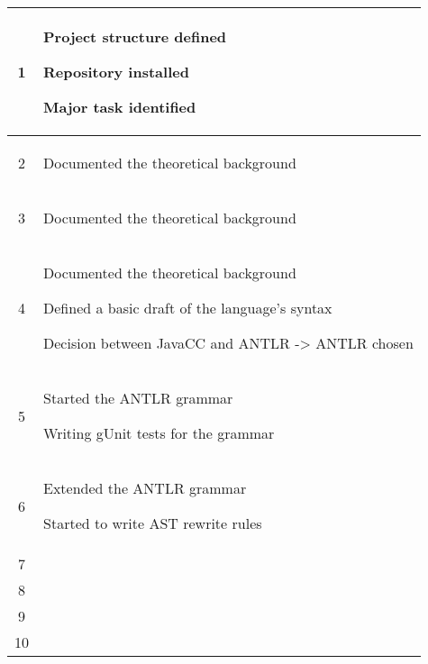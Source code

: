 \begin{center}
\begin{longtable}{|c|p{12cm}|}
1 & 
\begin{journal}
	\item Project structure defined
	\item Repository installed
	\item Major task identified
\end{journal}
\\ \hline
2 & 
\begin{journal}
	\item Documented the theoretical background
\end{journal}
\\ \hline
3 & 
\begin{journal}
	\item Documented the theoretical background
\end{journal}
\\ \hline
4 & 
\begin{journal}
	\item Documented the theoretical background
	\item Defined a basic draft of the language's syntax
	\item Decision between JavaCC and ANTLR -> ANTLR chosen
\end{journal}
\\ \hline
5 & 
\begin{journal}
	\item Started the ANTLR grammar
	\item Writing gUnit tests for the grammar
\end{journal}
\\ \hline
6 & 
\begin{journal}
	\item Extended the ANTLR grammar
	\item Started to write AST rewrite rules
\end{journal}
\\ \hline
7 & 
\begin{journal}
	\item 
\end{journal}
\\ \hline
8 & 
\begin{journal}
	\item 
\end{journal}
\\ \hline
9 & 
\begin{journal}
	\item 
\end{journal}
\\ \hline
10 & 

\end{longtable}
\end{center}
